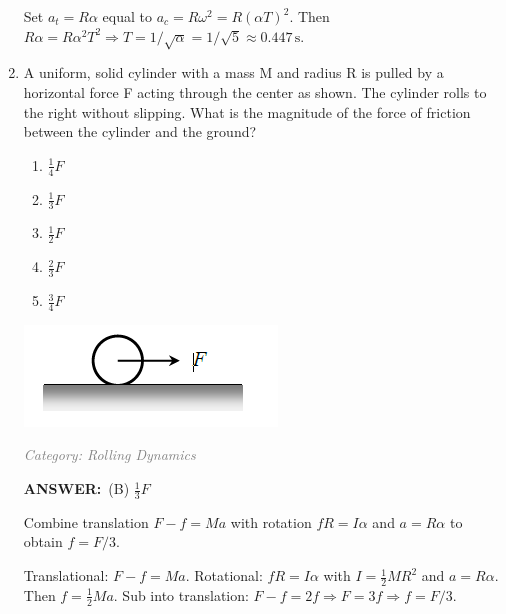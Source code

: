\documentclass[12pt, a4paper]{article}
\makeatletter
\newcommand{\finalanswer}[1]{\textbf{ANSWER:}~#1}
\newif\if@categoryprinted
\newcommand{\category}[1]{\if@categoryprinted\relax\else\textit{\textcolor{gray}{Category: #1}}\global\@categoryprintedtrue\fi}
\newcommand{\tags}[1]{}
\makeatother
\begin{document}
\begin{CJK*}{UTF8}{gbsn}
\begin{enumerate}[itemsep=1.0em, topsep=0.6em]
\begin{solutionbox}
Set $a_t=R\alpha$ equal to $a_c=R\omega^2=R(\alpha T)^2$. Then $R\alpha=R\alpha^2 T^2\Rightarrow T=1/\sqrt{\alpha}=1/\sqrt{5}\approx0.447\,\text{s}$.
\end{solutionbox}

\item \label{prob:16}
\noindent\begin{minipage}[t]{0.6\linewidth}
\vspace{0pt}
A uniform, solid cylinder with a mass M and radius R is pulled by a horizontal force F acting through the center as shown. The cylinder rolls to the right without slipping. What is the magnitude of the force of friction between the cylinder and the ground?
\begin{enumerate}[label=(\Alph*)]
    \item $\frac{1}{4}F$
    \item $\frac{1}{3}F$
    \item $\frac{1}{2}F$
    \item $\frac{2}{3}F$
    \item $\frac{3}{4}F$
\end{enumerate}
\end{minipage}%
\hfill
\begin{minipage}[t]{0.35\linewidth}
\vspace{0pt}
\centering
\includegraphics[width=\linewidth]{Problem_16_Figure.png}
\end{minipage}

\category{Rolling Dynamics} \tags{}
\begin{answerbox}
\finalanswer{(B) $\tfrac{1}{3}F$}
\end{answerbox}
\begin{insightbox}
Combine translation $F-f=Ma$ with rotation $fR=I\alpha$ and $a=R\alpha$ to obtain $f=F/3$.
\end{insightbox}
\begin{solutionbox}

Translational: $F-f=Ma$. Rotational: $fR=I\alpha$ with $I=\tfrac{1}{2}MR^2$ and $a=R\alpha$. Then $f=\tfrac{1}{2}Ma$. Sub into translation: $F-f=2f\Rightarrow F=3f\Rightarrow f=F/3$.
\end{solutionbox}


\end{enumerate}
\end{CJK*}
\end{document}
